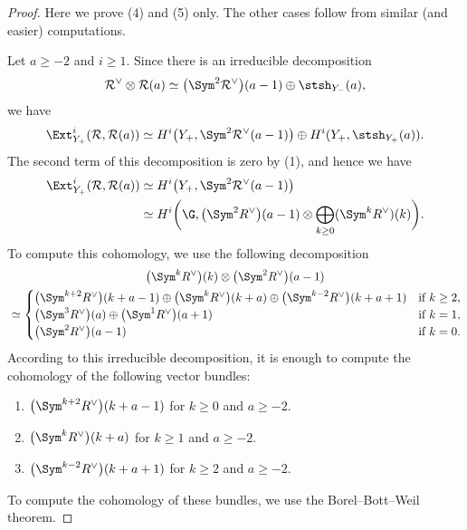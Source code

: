 \begin{proof}
Here we prove (4) and (5) only.
The other cases follow from similar (and easier) computations.

Let $a \geq -2$ and $i \geq 1$.
Since there is an irreducible decomposition
\begin{align*}
\mathcal{R}^{\vee} \otimes \mathcal{R}(a) \simeq \big(\Sym^2 \mathcal{R}^{\vee}\big)(a-1) \oplus \stsh_{Y_-}(a),
\end{align*}
we have
\begin{gather*}
\Ext_{Y_+}^{i}(\mathcal{R}, \mathcal{R}(a)) \simeq H^i\big(Y_+, \Sym^2 \mathcal{R}^{\vee}(a-1)\big) \oplus H^i(Y_+, \stsh_{Y_+}(a)).
\end{gather*}
The second term of this decomposition is zero by (1), and hence we have
\begin{align*}
\Ext_{Y_+}^{i}(\mathcal{R}, \mathcal{R}(a)) &\simeq H^i\big(Y_+, \Sym^2 \mathcal{R}^{\vee}(a-1)\big) \\
&\simeq H^i \bigg( \G, \big(\Sym^2 R^{\vee}\big)(a-1) \otimes \bigoplus_{k \geq 0} (\Sym^k R^{\vee})(k) \bigg).
\end{align*}
To compute this cohomology, we use the following decomposition
\begin{gather*}
\big(\Sym^k R^{\vee}\big)(k) \otimes \big(\Sym^2 R^{\vee}\big)(a-1)
\\
{}\simeq\begin{cases}
\big(\Sym^{k+2} R^{\vee}\big)(k+a-1) \oplus \big(\Sym^{k} R^{\vee}\big)(k+a) \oplus \big(\Sym^{k-2} R^{\vee}\big)(k+a+1) & \text{if}\ k \geq 2, \\
\big(\Sym^{3} R^{\vee}\big)(a) \oplus \big(\Sym^{1} R^{\vee}\big)(a+1) & \text{if}\ k = 1, \\
\big(\Sym^{2} R^{\vee}\big)(a-1) & \text{if}\ k=0.
\end{cases}
\end{gather*}
According to this irreducible decomposition, it is enough to compute the cohomology of the following vector bundles:
\begin{enumerate}\itemsep=0pt
\item[$(i)$] $\big(\Sym^{k+2} R^{\vee}\big)(k+a-1)$ for $k \geq 0$ and $a \geq -2$.
\item[$(ii)$] $\big(\Sym^{k} R^{\vee}\big)(k+a)$ for $k \geq 1$ and $a \geq -2$.
\item[$(iii)$] $\big(\Sym^{k-2} R^{\vee}\big)(k+a+1)$ for $k \geq 2$ and $a \geq -2$.
\end{enumerate}
To compute the cohomology of these bundles, we use the Borel--Bott--Weil theorem.

\end{proof}
